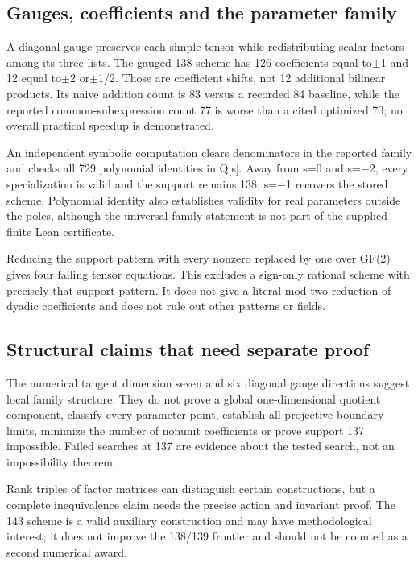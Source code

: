 \documentclass[11pt,a4paper]{article}
\begin{document}
\subsection{Gauges, coefficients and the parameter family}
A diagonal gauge preserves each simple tensor while redistributing scalar factors among its three lists. The gauged 138 scheme has 126 coefficients equal to\ensuremath{\pm}1 and 12 equal to\ensuremath{\pm}2 or\ensuremath{\pm}1/2. Those are coefficient shifts, not 12 additional bilinear products. Its naive addition count is 83 versus a recorded 84 baseline, while the reported common-subexpression count 77 is worse than a cited optimized 70; no overall practical speedup is demonstrated.

An independent symbolic computation clears denominators in the reported family and checks all 729 polynomial identities in Q[s]. Away from s=0 and s=\ensuremath{-}2, every specialization is valid and the support remains 138; s=\ensuremath{-}1 recovers the stored scheme. Polynomial identity also establishes validity for real parameters outside the poles, although the universal-family statement is not part of the supplied finite Lean certificate.

Reducing the support pattern with every nonzero replaced by one over GF(2) gives four failing tensor equations. This excludes a sign-only rational scheme with precisely that support pattern. It does not give a literal mod-two reduction of dyadic coefficients and does not rule out other patterns or fields.

\subsection{Structural claims that need separate proof}
The numerical tangent dimension seven and six diagonal gauge directions suggest local family structure. They do not prove a global one-dimensional quotient component, classify every parameter point, establish all projective boundary limits, minimize the number of nonunit coefficients or prove support 137 impossible. Failed searches at 137 are evidence about the tested search, not an impossibility theorem.

Rank triples of factor matrices can distinguish certain constructions, but a complete inequivalence claim needs the precise action and invariant proof. The 143 scheme is a valid auxiliary construction and may have methodological interest; it does not improve the 138/139 frontier and should not be counted as a second numerical award.
\end{document}
